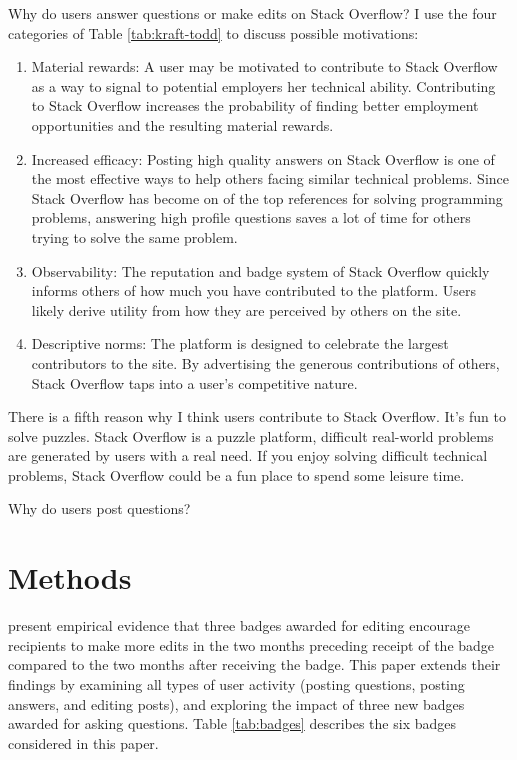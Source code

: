 \documentclass[conference]{IEEEtran}
\newcommand{\1}{\mathds{1}}
\begin{document}
Why do users answer questions or make edits on Stack Overflow? I use
the four categories of Table \ref{tab:kraft-todd} to discuss possible
motivations:
\begin{enumerate}
\item Material rewards: A user may be motivated to contribute to Stack
Overflow as a way to signal to potential employers her technical
ability. Contributing to Stack Overflow increases the probability of
finding better employment opportunities and the resulting material
rewards.

\item Increased efficacy: Posting high quality answers on Stack Overflow is
one of the most effective ways to help others facing similar technical
problems. Since Stack Overflow has become on of the top references for
solving programming problems, answering high profile questions saves a
lot of time for others trying to solve the same problem.

\item Observability: The reputation and badge system of Stack Overflow
quickly informs others of how much you have contributed to the
platform. Users likely derive utility from how they are perceived by
others on the site.

\item Descriptive norms: The platform is designed to celebrate the largest
contributors to the site. By advertising the generous contributions of
others, Stack Overflow taps into a user's competitive nature.
\end{enumerate}
There is a fifth reason why I think users contribute to Stack
Overflow. It's fun to solve puzzles. Stack Overflow is a puzzle
platform, difficult real-world problems are generated by users with a
real need. If you enjoy solving difficult technical problems, Stack
Overflow could be a fun place to spend some leisure time.

Why do users post questions?

\section{Methods}

\citet{Grant2013} present empirical evidence that three badges awarded for editing encourage recipients to make more edits in the two months preceding receipt of the badge compared to the two months after receiving the badge. This paper extends their findings by examining all types of user activity (posting questions, posting answers, and editing posts), and exploring the impact of three new badges awarded for asking questions. Table \ref{tab:badges} describes the six badges considered in this paper.
\end{document}
